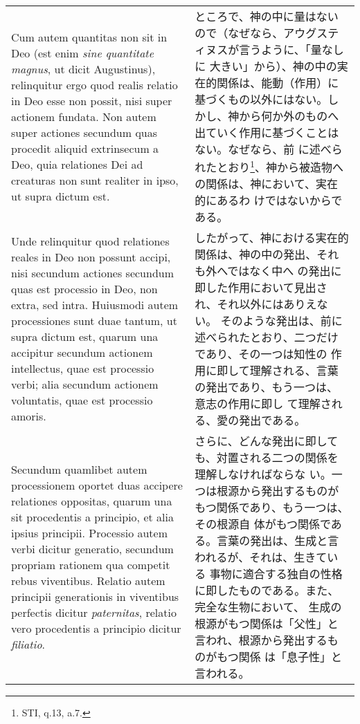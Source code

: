 \documentclass[10pt]{jsarticle} %
\begin{document}
\begin{longtable}{p{21em}p{21em}}
\\

Cum autem quantitas non sit in Deo (est enim {\itshape sine
quantitate magnus}, ut dicit Augustinus), relinquitur ergo quod realis
relatio in Deo esse non possit, nisi super actionem fundata. Non autem
super actiones secundum quas procedit aliquid extrinsecum a Deo, quia
relationes Dei ad creaturas non sunt realiter in ipso, ut supra dictum
est. 


&

ところで、神の中に量はないので（なぜなら、アウグスティヌスが言うように、「量なしに
 大きい」から）、神の中の実在的関係は、能動（作用）に基づくもの以外にはない。し
 かし、神から何か外のものへ出ていく作用に基づくことはない。なぜなら、前
 に述べられたとおり\footnote{STI, q.13, a.7.}、神から被造物への関係は、神において、実在的にあるわ
 けではないからである。



\\

Unde relinquitur quod relationes reales in Deo non possunt accipi,
nisi secundum actiones secundum quas est processio in Deo, non extra,
sed intra. Huiusmodi autem processiones sunt duae tantum, ut supra
dictum est, quarum una accipitur secundum actionem intellectus, quae est
processio verbi; alia secundum actionem voluntatis, quae est processio
amoris. 


&

したがって、神における実在的関係は、神の中の発出、それも外へではなく中へ
 の発出に即した作用において見出され、それ以外にはありえない。
そのような発出は、前に述べられたとおり、二つだけであり、その一つは知性の
 作用に即して理解される、言葉の発出であり、もう一つは、意志の作用に即し
 て理解される、愛の発出である。


\\


Secundum quamlibet autem processionem oportet duas accipere
relationes oppositas, quarum una sit procedentis a principio, et alia
ipsius principii. Processio autem verbi dicitur generatio, secundum
propriam rationem qua competit rebus viventibus. Relatio autem principii
generationis in viventibus perfectis dicitur {\itshape paternitas}, relatio vero
procedentis a principio dicitur {\itshape filiatio}. 


&


さらに、どんな発出に即しても、対置される二つの関係を理解しなければならな
 い。一つは根源から発出するものがもつ関係であり、もう一つは、その根源自
 体がもつ関係である。言葉の発出は、生成と言われるが、それは、生きている
 事物に適合する独自の性格に即したものである。また、完全な生物において、
 生成の根源がもつ関係は「父性」と言われ、根源から発出するものがもつ関係
 は「息子性」と言われる。



\end{longtable}
\end{document}

